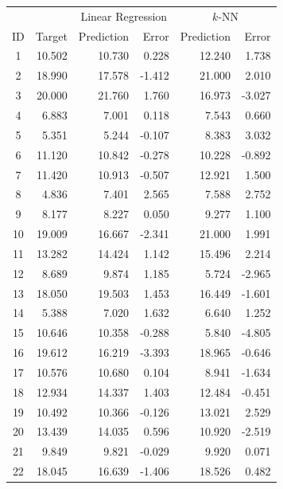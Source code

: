 \documentclass[xcolor={table}]{beamer}
\newcommand{\featN}[1]{\textsc{#1}}
\begin{document}
 \begin{frame} [plain]
\begin{table}[!bht]
\label{tab:continuousPredictionDataset}
\centering
\begin{tiny}
\begin{tabular}{ c r r r r r }
\hline
	 & 	& \multicolumn{2}{c}{Linear Regression} & \multicolumn{2}{c}{$k$-NN} \\
\featN{ID}	 & Target	& Prediction & Error & Prediction & Error\\
\hline
1	&	10.502	&	10.730	&	0.228	&	12.240	&	1.738	\\
2	&	18.990	&	17.578	&	-1.412	&	21.000	&	2.010	\\
3	&	20.000	&	21.760	&	1.760	&	16.973	&	-3.027	\\
4	&	6.883	&	7.001	&	0.118	&	7.543	&	0.660	\\
5	&	5.351	&	5.244	&	-0.107	&	8.383	&	3.032	\\
6	&	11.120	&	10.842	&	-0.278	&	10.228	&	-0.892	\\
7	&	11.420	&	10.913	&	-0.507	&	12.921	&	1.500	\\
8	&	4.836	&	7.401	&	2.565	&	7.588	&	2.752	\\
9	&	8.177	&	8.227	&	0.050	&	9.277	&	1.100	\\
10	&	19.009	&	16.667	&	-2.341	&	21.000	&	1.991	\\
11	&	13.282	&	14.424	&	1.142	&	15.496	&	2.214	\\
12	&	8.689	&	9.874	&	1.185	&	5.724	&	-2.965	\\
13	&	18.050	&	19.503	&	1.453	&	16.449	&	-1.601	\\
14	&	5.388	&	7.020	&	1.632	&	6.640	&	1.252	\\
15	&	10.646	&	10.358	&	-0.288	&	5.840	&	-4.805	\\
16	&	19.612	&	16.219	&	-3.393	&	18.965	&	-0.646	\\
17	&	10.576	&	10.680	&	0.104	&	8.941	&	-1.634	\\
18	&	12.934	&	14.337	&	1.403	&	12.484	&	-0.451	\\
19	&	10.492	&	10.366	&	-0.126	&	13.021	&	2.529	\\
20	&	13.439	&	14.035	&	0.596	&	10.920	&	-2.519	\\
21	&	9.849	&	9.821	&	-0.029	&	9.920	&	0.071	\\
22	&	18.045	&	16.639	&	-1.406	&	18.526	&	0.482	\\

\end{tabular}
\end{tiny}
\end{table}
\end{frame}
\end{document}
